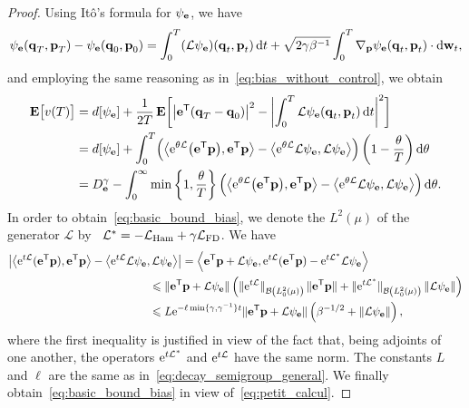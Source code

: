 \documentclass[11pt,a4paper]{article}
\begin{document}
\begin{proof}
    Using Itô's formula for $\psi_{\boldsymbol{\mathbf e}}$,
    we have
    \[
        \psi_{\boldsymbol{\mathbf e}}(\boldsymbol{\mathbf q}_T, \boldsymbol{\mathbf p}_T) - \psi_{\boldsymbol{\mathbf e}}(\boldsymbol{\mathbf q}_0, \boldsymbol{\mathbf p}_0)
        = \int_{0}^{T} (\mathcal L \psi_{\boldsymbol{\mathbf e}}) (\boldsymbol{\mathbf q}_t, \boldsymbol{\mathbf p}_t) \, \mathrm d t
        + \sqrt{2 \gamma \beta^{-1}} \int_{0}^{T} \nabla_{\boldsymbol{\mathbf p}} \psi_{\boldsymbol{\mathbf e}} (\boldsymbol{\mathbf q}_t, \boldsymbol{\mathbf p}_t) \cdot \mathrm d \boldsymbol{\mathbf w}_t,
    \]
    and employing the same reasoning as in~\eqref{eq:bias_without_control}, we obtain
    \begin{align*}
        \expect \bigl[v(T)\bigr]
    &= d[\psi_{\vect e}] +  \frac{1}{2T} \, \expect \biggl[ \bigl\lvert \vect e^\t (\vect q_T - \vect q_0) \bigr\rvert^2 - \biggl| \int_0^T {\mathcal L \psi_{\vect e}}(\vect q_t, \vect p_t) \, \d t \biggr|^2 \biggr] \\
    &= d[\psi_{\vect e}] +  \int_{0}^{T} \Bigl( \ip{\e^{\theta \mathcal L}\bigl(\vect e^\t \vect p\bigr)}{\vect e^\t \vect p} - \ip{\e^{\theta \mathcal L} \mathcal L \psi_{\vect e}}{\mathcal L \psi_{\vect e}} \Bigr) \left( 1 - \frac{\theta}{T} \right) \d \theta \\
    &= D^{\gamma}_{\vect e} - \int_{0}^{\infty} \min\left\{1, \frac{\theta}{T}\right\} \Bigl( \ip{\e^{\theta \mathcal L}\bigl(\vect e^\t \vect p\bigr)}{\vect e^\t  \vect p} - \ip{\e^{\theta \mathcal L} \mathcal L \psi_{\vect e}}{\mathcal L \psi_{\vect e}} \Bigr) \, \d \theta.
    \end{align*}
    In order to obtain~\eqref{eq:basic_bound_bias},
    we denote the $L^2(\mu)$ of the generator $\mathcal L$ by~
    \(
        \mathcal L^* = - \mathcal L_{\rm Ham} + \gamma \mathcal L_{\rm FD}
    \).
    We have
    \begin{align*}
        \left\lvert \ip{\e^{t \mathcal L}(\vect e^\t \vect p)}{\vect e^\t \vect p} - \ip{\e^{t \mathcal L} \mathcal L \psi_{\vect e}}{\mathcal L \psi_{\vect e}} \right\rvert
    &= \ip{\vect e^\t \vect p + \mathcal L \psi_{\vect e}}{\e^{t \mathcal L} (\vect e^\t \vect p) - \e^{t \mathcal L^*} \mathcal  L\psi_{\vect e}} \\
    &\hspace{-1cm} \leq \norm*{\vect e^\t \vect p + \mathcal L \psi_{\vect e}}
    \left( \norm*{\e^{t \mathcal L}}[\mathcal B\left(L^2_0(\mu) \right)] \, \norm*{\vect e^\t \vect p} + \norm*{\e^{t \mathcal L^*}}[\mathcal B\left(L^2_0(\mu) \right)] \norm{\mathcal L \psi_{\vect e}} \right) \\
    &\hspace{-1cm} \leq L \e^{- \ell \min\{\gamma, \gamma^{-1}\} t} \norm*{\vect e^\t \vect p + \mathcal L\psi_{\vect e}}  \left(\beta^{-1/2} + \norm{\mathcal L \psi_{\vect e}} \right),
    \end{align*}
    where the first inequality is justified in view of the fact that,
    being adjoints of one another,
    the operators $\mathrm{e}^{t \mathcal L^*}$ and $\mathrm{e}^{t \mathcal L}$ have the same norm.
    The constants $L$ and $\ell$ are the same as in~\eqref{eq:decay_semigroup_general}.
    We finally obtain~\eqref{eq:basic_bound_bias} in view of~\eqref{eq:petit_calcul}.
\end{proof}
\end{document}
